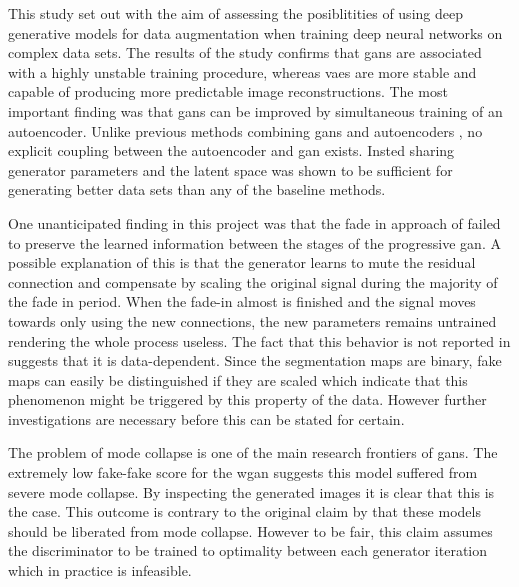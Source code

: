 This study set out with the aim of assessing the posiblitities of using deep generative models for data augmentation when training deep neural networks on complex data sets. The results of the study confirms that \acrshort{gans} are associated with a highly unstable training procedure, whereas \acrshort{vaes} are more stable and capable of producing more predictable image reconstructions. The most important finding was that \acrshort{gans} can be improved by simultaneous training of an autoencoder. Unlike previous methods combining \acrshort{gans} and autoencoders \parencite{LarsenSW15autoencodingbeyond, nguyen2016plug, donahue2016adversarial, ulyanovVL17adversarial}, no explicit coupling between the autoencoder and \acrshort{gan} exists. Insted sharing generator parameters and the latent space was shown to be sufficient for generating better data sets than any of the baseline methods.

One unanticipated finding in this project was that the fade in approach of \textcite{karras2017progressive} failed to preserve the learned information between the stages of the progressive \acrshort{gan}. A possible explanation of this is that the generator learns to mute the residual connection and compensate by scaling the original signal during the majority of the fade in period. When the fade-in almost is finished and the signal moves towards only using the new connections, the new parameters remains untrained rendering the whole process useless. The fact that this behavior is not reported in \parencite{karras2017progressive} suggests that it is data-dependent. Since the segmentation maps are binary, fake maps can easily be distinguished if they are scaled which indicate that this phenomenon might be triggered by this property of the data. However further investigations are necessary before this can be stated for certain.

The problem of mode collapse is one of the main research frontiers of \acrshort{gans}. The extremely low fake-fake score for the \acrlong{wgan} suggests this model suffered from severe mode collapse. By inspecting the generated images it is clear that this is the case. This outcome is contrary to the original claim by \textcite{arjovsky2017wasserstein} that these models should be liberated from mode collapse. However to be fair, this claim assumes the discriminator to be trained to optimality between each generator iteration which in practice is infeasible. 

